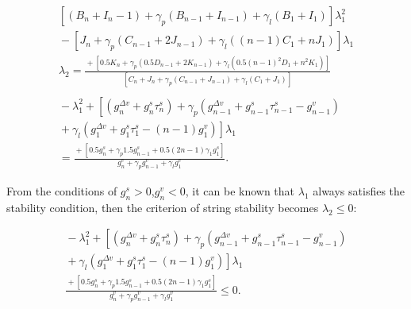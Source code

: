 \documentclass[journal]{IEEEtran}
\begin{document}
\begin{equation}
\begin{gathered}
{\left[\left(B_{n}\!+\!I_{n}\!-\!1\right)\!+\!\gamma_{p}\left(B_{n\!-\!1}\!+\!I_{n\!-\!1}\right)\!+\!\gamma_{l}\left(B_{1}\!+\!I_{1}\right)\right] \lambda_{1}^{2}} \\
\!-\!\left[J_{n}\!+\!\gamma_{p}\left(C_{n\!-\!1}\!+\!2 J_{n\!-\!1}\right)\!+\!\gamma_{l}\left((n\!-\!1) C_{1}\!+\!n J_{1}\right)\right] \lambda_{1} \\
\lambda_{2}=\frac{\!+\!\left[0.5 K_{n}\!+\!\gamma_{p}\left(0.5 D_{n\!-\!1}\!+\!2 K_{n\!-\!1}\right)\!+\!\gamma_{l}\left(0.5(n\!-\!1)^{2} D_{1}\!+\!n^{2} K_{1}\right)\right]}{\left[C_{n}\!+\!J_{n}\!+\!\gamma_{p}\left(C_{n\!-\!1}\!+\!J_{n\!-\!1}\right)\!+\!\gamma_{l}\left(C_{1}\!+\!J_{1}\right)\right]} \\
\\
\!-\!\lambda_{1}^{2}\!+\!\left[\left(g_{n}^{\Delta v}\!+\!g_{n}^{s} \tau_{n}^{s}\right)\!+\!\gamma_{p}\left(g_{n\!-\!1}^{\Delta v}\!+\!g_{n\!-\!1}^{s} \tau_{n\!-\!1}^{s}\!-\!g_{n\!-\!1}^{v}\right)\right. \\
\left.\!+\!\gamma_{l}\left(g_{1}^{\Delta v}\!+\!g_{1}^{s} \tau_{1}^{s}\!-\!(n\!-\!1) g_{1}^{v}\right)\right] \lambda_{1} \\
=    \frac{\!+\!\left[0.5 g_{n}^{s}\!+\!\gamma_{p} 1.5 g_{n\!-\!1}^{s}\!+\!0.5(2 n\!-\!1) \gamma_{1} g_{1}^{s}\right]}{g_{n}^{v}\!+\!\gamma_{p} g_{n\!-\!1}^{v}\!+\!\gamma_{l} g_{1}^{v}}.
\end{gathered}
\label{Eq18}
\end{equation}




From the conditions of $g_n^s>0$,$g_n^v<0$, it can be known that $\lambda_1$ always satisfies the stability condition, then the criterion of string stability becomes $\lambda_2\leq0$:




\begin{equation}
\begin{gathered}
\!-\!\lambda_{1}^{2}\!+\!\left[\left(g_{n}^{\Delta v}\!+\!g_{n}^{s} \tau_{n}^{s}\right)\!+\!\gamma_{p}\left(g_{n\!-\!1}^{\Delta v}\!+\!g_{n\!-\!1}^{s} \tau_{n\!-\!1}^{s}\!-\!g_{n\!-\!1}^{v}\right)\right. \\
\left.\!+\!\gamma_{l}\left(g_{1}^{\Delta v}\!+\!g_{1}^{s} \tau_{1}^{s}\!-\!(n\!-\!1) g_{1}^{v}\right)\right] \lambda_{1} \\
\frac{\!+\!\left[0.5 g_{n}^{s}\!+\!\gamma_{p} 1.5 g_{n\!-\!1}^{s}\!+\!0.5(2 n\!-\!1) \gamma_{1} g_{1}^{s}\right]}{g_{n}^{v}\!+\!\gamma_{p} g_{n\!-\!1}^{v}\!+\!\gamma_{l} g_{1}^{v}} \leq 0 .
\end{gathered}
\label{Eq19}
\end{equation}
\end{document}
